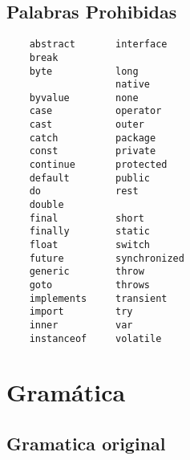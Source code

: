 \documentclass [a4paper,titlepage]{report}
\begin{document}
\subsection{Palabras Prohibidas}

\begin{verbatim}
    abstract       interface
    break          
    byte           long
                   native
    byvalue        none
    case           operator
    cast           outer
    catch          package
    const          private
    continue       protected
    default        public
    do             rest
    double         
    final          short
    finally        static
    float          switch
    future         synchronized
    generic        throw
    goto           throws
    implements     transient
    import         try
    inner          var
    instanceof     volatile
\end{verbatim}

\section{Gramática}

\subsection{Gramatica original}
\end{document}
